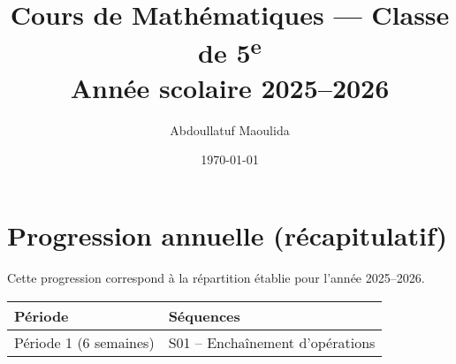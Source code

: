 \documentclass[12pt,a4paper]{book}
\title{Cours de Mathématiques — Classe de 5\textsuperscript{e}\\[0.4em]\large Année scolaire 2025–2026}
\author{Abdoullatuf Maoulida}
\date{\today}
\begin{document}
\maketitle
\tableofcontents
\cleardoublepage


\cleardoublepage
\appendix
\chapter{Progression annuelle (récapitulatif)}
Cette progression correspond à la répartition établie pour l'année 2025–2026.

\begin{center}
\begin{tabular}{|l|l|}
\hline
\textbf{Période} & \textbf{Séquences}\\ \hline
Période 1 (6 semaines) & S01 -- Enchaînement d'opérations\\ \hline
\end{tabular}
\end{center}
\end{document}
